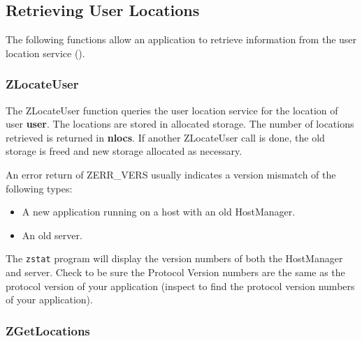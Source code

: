 %
\subsection{Retrieving User Locations}
\label{retrieving-locations}

The following functions allow an application to retrieve information
from the user location service ().

\subsubsection{ZLocateUser}
\label{ZLocateUser}

\etemplate
{}

The ZLocateUser function queries the user location service for the
location of user {\bf user}.  The locations are stored in allocated
storage.  The number of locations retrieved is returned in {\bf *nlocs}.
If another ZLocateUser call is done, the old storage is freed and new
storage allocated as necessary.

An error return of ZERR_VERS usually indicates a version mismatch of the
following types:
\begin{itemize}
\item A new application running on a host with an old HostManager.
\item An old server.
\end{itemize}
The {\tt zstat} program will display the version numbers of both the
HostManager and server.  Check to be sure the Protocol Version numbers
are the same as the protocol version of your application (inspect
 to find the protocol version
numbers of your application).

\subsubsection{ZGetLocations}
\label{ZGetLocations}

\etemplate
{}

